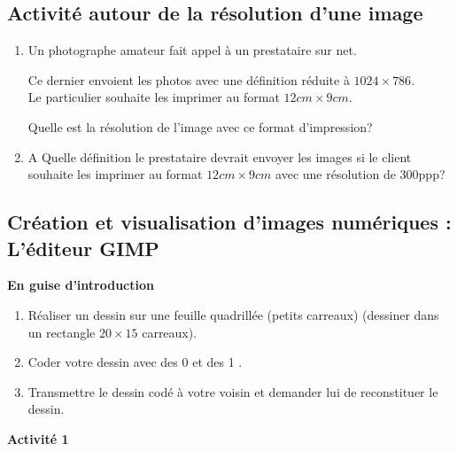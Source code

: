 \documentclass[10pt,fleqn]{article} %
\begin{document}
\subsection{Activité autour de la résolution d'une image }


\begin{enumerate}

	\item Un photographe amateur fait appel à un prestataire sur net.
	
	\medskip
	
	Ce dernier envoient les photos avec une définition réduite à $1024 \times 786$.\\
	Le particulier souhaite les imprimer au format $12cm \times 9cm$.
	
	\medskip
	Quelle est la résolution de l'image avec ce format d'impression?
	\medskip
	
	\item 
	A Quelle définition le prestataire devrait envoyer les images si le client souhaite les imprimer  au format $12cm \times 9cm$ avec une résolution de 300ppp?
	
\end{enumerate}



\subsection{Création et visualisation d'images numériques : L'éditeur GIMP}

\vspace{0.3cm}
\textbf{En guise d'introduction}

\vspace{0.2cm}



\begin{enumerate}
	\item Réaliser un dessin sur une feuille quadrillée (petits carreaux) (dessiner dans un rectangle $20 \times 15$ carreaux).
	\item Coder votre dessin avec  des 0 et des 1  .
	\item Transmettre le dessin codé à votre voisin et demander lui de reconstituer le dessin.
\end{enumerate}


\vspace{0.4cm}


\textbf{Activité 1}

\vspace{0.2cm}
\end{document}
